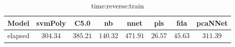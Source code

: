 \begin{table}[!ht]
	\centering
	\begin{tabular}{|c|c|c|c|c|c|c|c|}
		\hline
		Model & svmPoly & C5.0 & nb & nnet & pls & fda & pcaNNet \\ \hline
		elapsed & $304.34$ & $385.21$ & $140.32$ & $471.91$ & $26.57$ & $45.63$ & $311.39$ \\ \hline
	\end{tabular}
	\caption{time:reverse:train}
	\label{tab:time:reverse:train}
\end{table}
